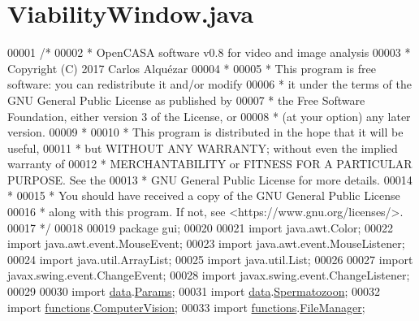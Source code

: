 \hypertarget{_viability_window_8java_source}{}\section{Viability\+Window.\+java}
\label{_viability_window_8java_source}

\begin{DoxyCode}
00001 \textcolor{comment}{/*}
00002 \textcolor{comment}{ *   OpenCASA software v0.8 for video and image analysis}
00003 \textcolor{comment}{ *   Copyright (C) 2017  Carlos Alquézar}
00004 \textcolor{comment}{ *}
00005 \textcolor{comment}{ *   This program is free software: you can redistribute it and/or modify}
00006 \textcolor{comment}{ *   it under the terms of the GNU General Public License as published by}
00007 \textcolor{comment}{ *   the Free Software Foundation, either version 3 of the License, or}
00008 \textcolor{comment}{ *   (at your option) any later version.}
00009 \textcolor{comment}{ *}
00010 \textcolor{comment}{ *   This program is distributed in the hope that it will be useful,}
00011 \textcolor{comment}{ *   but WITHOUT ANY WARRANTY; without even the implied warranty of}
00012 \textcolor{comment}{ *   MERCHANTABILITY or FITNESS FOR A PARTICULAR PURPOSE.  See the}
00013 \textcolor{comment}{ *   GNU General Public License for more details.}
00014 \textcolor{comment}{ *}
00015 \textcolor{comment}{ *   You should have received a copy of the GNU General Public License}
00016 \textcolor{comment}{ *   along with this program.  If not, see <https://www.gnu.org/licenses/>.}
00017 \textcolor{comment}{*/}    
00018 
00019 \textcolor{keyword}{package }gui;
00020 
00021 \textcolor{keyword}{import} java.awt.Color;
00022 \textcolor{keyword}{import} java.awt.event.MouseEvent;
00023 \textcolor{keyword}{import} java.awt.event.MouseListener;
00024 \textcolor{keyword}{import} java.util.ArrayList;
00025 \textcolor{keyword}{import} java.util.List;
00026 
00027 \textcolor{keyword}{import} javax.swing.event.ChangeEvent;
00028 \textcolor{keyword}{import} javax.swing.event.ChangeListener;
00029 
00030 \textcolor{keyword}{import} \hyperlink{namespacedata}{data}.\hyperlink{classdata_1_1_params}{Params};
00031 \textcolor{keyword}{import} \hyperlink{namespacedata}{data}.\hyperlink{classdata_1_1_spermatozoon}{Spermatozoon};
00032 \textcolor{keyword}{import} \hyperlink{namespacefunctions}{functions}.\hyperlink{classfunctions_1_1_computer_vision}{ComputerVision};
00033 \textcolor{keyword}{import} \hyperlink{namespacefunctions}{functions}.\hyperlink{classfunctions_1_1_file_manager}{FileManager};

\end{DoxyCode}
